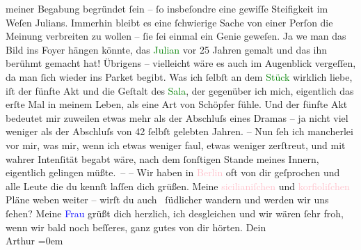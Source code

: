                meiner Begabung begründet ſein – ſo insbeſondre eine gewiſſe Steifigkeit im Weſen {\pb}Julians. Immerhin
               bleibt es eine ſchwierige Sache von einer Perſon die Meinung verbreiten zu wollen –
               ſie ſei einmal ein Genie geweſen. Ja we{\geminationn} man das Bild
               ins Foyer hängen könnte, das \textcolor{green}{Julian}{} vor 25 Jahren gemalt und das ihn berühmt gemacht hat! Übrigens –
               vielleicht wäre es auch im Augenblick vergeſſen, da man ſich wieder ins Parket
               begibt.\pend
           \pstart
           Was ich ſelbſt an dem \textcolor{green}{Stück}{}
               wirklich liebe, iſt der fünfte Akt und die {\pb}Geſtalt des \textcolor{green}{Sala}{}, der gegenüber ich mich,
               eigentlich das erſte Mal in meinem Leben, als eine Art von Schöpfer fühle. Und der
               fünfte Akt bedeutet mir zuweilen etwas mehr als der Abschluſs eines Dramas – ja nicht
               viel weniger als der Abschluſs von 42 ſelbſt gelebten Jahren. \introOben{}–\introOben{} Nun ſeh ich mancherlei vor mir, was mir, wenn ich etwas weniger faul,
               etwas weniger zerſtreut, und mit \strikeout{\textcolor{gray}{×}\-\textcolor{gray}{×}\-\textcolor{gray}{×}\-\textcolor{gray}{×}-} wahrer Intenſität
               begabt wäre, nach dem ſonſtigen Stande meines Innern, eigentlich gelingen
               müßte. –\pend
           \pstart
           {\pb}– Wir haben in \textcolor{pink}{Berlin}{}\ledrightnote{\textcolor{pink}{Berlin}} oft von dir geſprochen und alle Leute die du
               kennſt laſſen dich grüßen. Meine \textcolor{pink}{sicilianiſchen}{}\ledrightnote{\textcolor{pink}{Sizilien}} und
                  \textcolor{pink}{korfioliſchen}{}\ledrightnote{\textcolor{pink}{Korfu}} Pläne weben weiter – wirſt du
               auch  ſüdlicher wandern und werden wir uns ſehen? Meine \textcolor{blue}{Frau}{} grüßt dich herzlich, ich desgleichen und wir wären
               ſehr froh, wenn wir bald noch beſſeres, ganz gutes von dir hörten.\pend
           \pstart
           Dein{\\[\baselineskip]}\spacefill\mbox{Arthur}\pend
           \leftskip=0em{}\endnumbering{}  
      